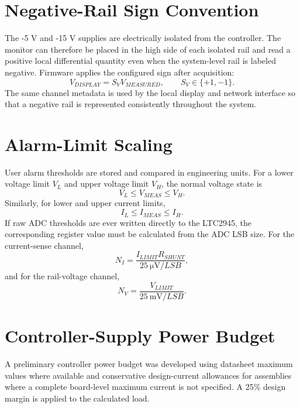 \section{Negative-Rail Sign Convention}
The -5 V and -15 V supplies are electrically isolated from the controller. The
monitor can therefore be placed in the high side of each isolated rail and read a
positive local differential quantity even when the system-level rail is labeled
negative. Firmware applies the configured sign after acquisition:
\begin{equation}
    V_{DISPLAY}=S_VV_{MEASURED},\qquad S_V\in\{+1,-1\}.
\end{equation}
The same channel metadata is used by the local display and network interface so
that a negative rail is represented consistently throughout the system.

\section{Alarm-Limit Scaling}
User alarm thresholds are stored and compared in engineering units. For a lower
voltage limit $V_L$ and upper voltage limit $V_H$, the normal voltage state is
\begin{equation}
    V_L\le V_{MEAS}\le V_H.
\end{equation}
Similarly, for lower and upper current limits,
\begin{equation}
    I_L\le I_{MEAS}\le I_H.
\end{equation}
If raw ADC thresholds are ever written directly to the LTC2945, the corresponding
register value must be calculated from the ADC LSB size. For the current-sense
channel,
\begin{equation}
    N_I=\frac{I_{LIMIT}R_{SHUNT}}{\SI{25}{\micro\volt/LSB}},
\end{equation}
and for the rail-voltage channel,
\begin{equation}
    N_V=\frac{V_{LIMIT}}{\SI{25}{\milli\volt/LSB}}.
\end{equation}

\section{Controller-Supply Power Budget}

A preliminary controller power budget was developed using datasheet maximum
values where available and conservative design-current allowances for assemblies
where a complete board-level maximum current is not specified. A 25\% design
margin is applied to the calculated load.

